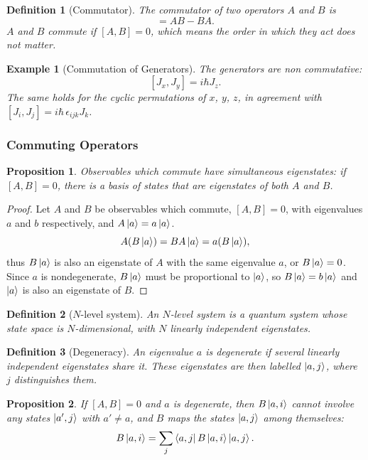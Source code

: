 \documentclass{article}
\newtheorem{definition}{Definition}
\newtheorem*{example}{Example}
\newtheorem{proposition}{Proposition}
\begin{document}
\begin{definition}[Commutator]
    \label{def:commutator}
    The commutator of two operators $A$ and $B$ is
    \begin{equation}
        [A,B] = AB - BA.
    \end{equation}
    $A$ and $B$ commute if $[A,B] = 0$, which means the order in which they act does not matter.
\end{definition}
\begin{example}[Commutation of Generators]
    The generators are non commutative:
    \[[J_x, J_y] = i\hbar J_z.\]
    The same holds for the cyclic permutations of $x$, $y$, $z$, in agreement with $[J_i, J_j] = i\hbar\,\epsilon_{ijk}J_k$.
\end{example}

\subsubsection{Commuting Operators}
\begin{proposition}
    \label{prop:simultaneous-eigenstates}
    Observables which commute have simultaneous eigenstates: if $[A,B] = 0$, there is a basis of states that are eigenstates of both $A$ and $B$.
\end{proposition}
\begin{proof}
    Let $A$ and $B$ be observables which commute, $[A,B] = 0$, with eigenvalues $a$ and $b$ respectively, and $A\ket{a} = a\ket{a}$.
    \begin{equation}
        \label{eq:nondegenerate-eigenstate}
        A(B\ket{a}) = BA\ket{a} = a(B\ket{a}),
    \end{equation}
    thus $B\ket{a}$ is also an eigenstate of $A$ with the same eigenvalue $a$, or $B\ket{a} = 0$. Since $a$ is nondegenerate, $B\ket{a}$ must be proportional to $\ket{a}$, so $B\ket{a} = b\ket{a}$ and $\ket{a}$ is also an eigenstate of $B$.
\end{proof}
\begin{definition}[$N$-level system]
    An $N$-level system is a quantum system whose state space is $N$-dimensional, with $N$ linearly independent eigenstates.
\end{definition}
\begin{definition}[Degeneracy]
    An eigenvalue $a$ is degenerate if several linearly independent eigenstates share it. These eigenstates are then labelled $\ket{a,j}$, where $j$ distinguishes them.
\end{definition}
\begin{proposition}
    \label{prop:degenerate-mapping}
    If $[A,B] = 0$ and $a$ is degenerate, then $B\ket{a,i}$ cannot involve any states $\ket{a',j}$ with $a' \neq a$, and $B$ maps the states $\ket{a,j}$ among themselves:
    \begin{equation*}
        B\ket{a,i} = \sum_j\bra{a,j}B\ket{a,i}\ket{a,j}.
    \end{equation*}
\end{proposition}
\end{document}
